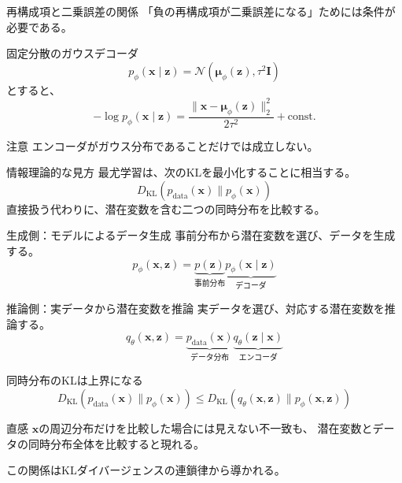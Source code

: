 \begin{frame}{再構成項と二乗誤差の関係}
    「負の再構成項が二乗誤差になる」ためには条件が必要である。
    \begin{block}{固定分散のガウスデコーダ}
        \[
            p_\phi(\boldsymbol{x}\mid\boldsymbol{z})
            =
            \mathcal{N}\!\left(
            \boldsymbol{\mu}_\phi(\boldsymbol{z}),\tau^2\mathbf{I}
            \right)
        \]
        とすると、
        \[
            -\log p_\phi(\boldsymbol{x}\mid\boldsymbol{z})
            =
            \frac{\|\boldsymbol{x}-\boldsymbol{\mu}_\phi(\boldsymbol{z})\|_2^2}
            {2\tau^2}
            +\text{const.}
        \]
    \end{block}
    \begin{alertblock}{注意}
        エンコーダがガウス分布であることだけでは成立しない。
    \end{alertblock}
\end{frame}
\begin{frame}{情報理論的な見方}
    最尤学習は、次のKLを最小化することに相当する。
    \[
        D_{\mathrm{KL}}\!\left(
        p_{\mathrm{data}}(\boldsymbol{x})
        \|p_\phi(\boldsymbol{x})
        \right)
    \]
    直接扱う代わりに、潜在変数を含む二つの同時分布を比較する。
    \begin{block}{生成側：モデルによるデータ生成}
        事前分布から潜在変数を選び、データを生成する。
        \[
            p_\phi(\boldsymbol{x},\boldsymbol{z})
            =
            \underbrace{p(\boldsymbol{z})}_{\text{事前分布}}
            \underbrace{p_\phi(\boldsymbol{x}\mid\boldsymbol{z})}_{\text{デコーダ}}
        \]
    \end{block}
    \begin{block}{推論側：実データから潜在変数を推論}
        実データを選び、対応する潜在変数を推論する。
        \[
            q_\theta(\boldsymbol{x},\boldsymbol{z})
            =
            \underbrace{p_{\mathrm{data}}(\boldsymbol{x})}_{\text{データ分布}}
            \underbrace{q_\theta(\boldsymbol{z}\mid\boldsymbol{x})}_{\text{エンコーダ}}
        \]
    \end{block}
\end{frame}
\begin{frame}{同時分布のKLは上界になる}
    \[
        \boxed{
        D_{\mathrm{KL}}\!\left(
        p_{\mathrm{data}}(\boldsymbol{x})\|p_\phi(\boldsymbol{x})
        \right)
        \leq
        D_{\mathrm{KL}}\!\left(
        q_\theta(\boldsymbol{x},\boldsymbol{z})
        \|p_\phi(\boldsymbol{x},\boldsymbol{z})
        \right)
        }
    \]
    \begin{exampleblock}{直感}
        $\boldsymbol{x}$の周辺分布だけを比較した場合には見えない不一致も、
        潜在変数とデータの同時分布全体を比較すると現れる。
    \end{exampleblock}
    この関係はKLダイバージェンスの連鎖律から導かれる。
\end{frame}
